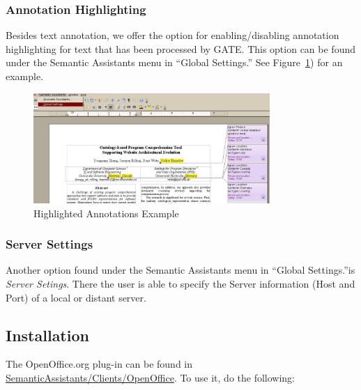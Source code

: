 \subsubsection{Annotation Highlighting}
Besides text annotation, we offer the option for enabling/disabling annotation
highlighting for text that has been processed by GATE. This option can be
found under the Semantic Assistants menu in ``Global Settings.''  See
Figure~\ref{fig:highlight}) for an example.

\begin{figure}
  \centering
  \includegraphics[width=0.8\textwidth]{pictures/highlighting.jpg}
  \caption{Highlighted Annotations Example}
  \label{fig:highlight}
\end{figure}

\subsubsection{Server Settings}
Another option found under the Semantic Assistants menu in ``Global
Settings.''is \emph{Server Setings}.  There the user is able to specify the
Server information (Host and Port) of a local or distant server.

\subsection{Installation}
\label{subsec:oo-inst}
The OpenOffice.org plug-in can be found in
\url{SemanticAssistants/Clients/OpenOffice}. To use it, do the following:

